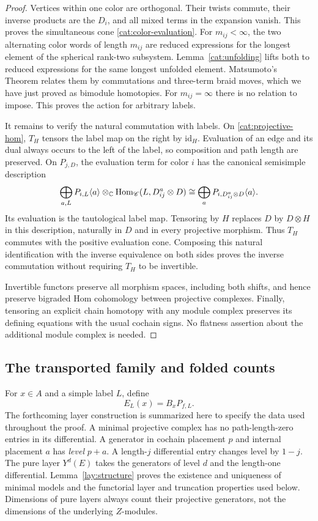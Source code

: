 \begin{proof}
Vertices within one color are orthogonal.  Their twists commute,
their inverse products are the $D_i$, and all mixed terms in the
expansion vanish.  This proves the simultaneous cone
\eqref{cat:color-evaluation}.  For $m_{ij}<\infty$, the two
alternating color words of length $m_{ij}$ are reduced expressions
for the longest element of the spherical rank-two subsystem.
Lemma~\ref{cat:unfolding} lifts both to reduced expressions for
the same longest unfolded element.  Matsumoto's Theorem relates
them by commutations and three-term braid moves, which we have
just proved as bimodule homotopies.  For $m_{ij}=\infty$ there is
no relation to impose.  This proves the action for arbitrary labels.

It remains to verify the natural commutation with labels.  On
\eqref{cat:projective-hom}, $T_H$ tensors the label map on the
right by $\mathrm{id}_H$.  Evaluation of an edge and its dual
always occurs to the left of the label, so composition and path
length are preserved.  On $P_{j,D}$, the evaluation term for
color $i$ has the canonical semisimple description
\[
 \bigoplus_{a,L}P_{i,L}\langle a\rangle\otimes_\mathbb C
             \operatorname{Hom}_{\mathscr C}(L,D^a_{ij}\otimes D)
 \cong\bigoplus_a P_{i,D^a_{ij}\otimes D}\langle a\rangle.
\]
Its evaluation is the tautological label map.  Tensoring by $H$
replaces $D$ by $D\otimes H$ in this description, naturally in
$D$ and in every projective morphism.  Thus $T_H$ commutes with
the positive evaluation cone.  Composing this natural
identification with the inverse equivalence on both sides proves
the inverse commutation without requiring $T_H$ to be invertible.

Invertible functors preserve all morphism spaces, including both
shifts, and hence preserve bigraded Hom cohomology between
projective complexes.  Finally, tensoring an explicit chain
homotopy with any module complex preserves its defining equations
with the usual cochain signs.  No flatness assertion about the
additional module complex is needed.
\end{proof}

\subsection{The transported family and folded counts}

For $x\in A$ and a simple label $L$, define
\begin{equation}
 E_L(x)=B_xP_{f,L}.
 \label{cat:family-definition}
\end{equation}
The forthcoming layer construction is summarized here to specify
the data used throughout the proof.  A minimal projective complex
has no path-length-zero entries in its differential.  A generator in
cochain placement $p$ and internal placement $a$ has \emph{level}
$p+a$.  A length-$j$ differential entry changes level by $1-j$.
The pure layer $Y^d(E)$ takes the generators of level $d$ and the
length-one differential.  Lemma~\ref{lay:structure} proves the
existence and uniqueness of minimal models and the functorial layer
and truncation properties used below.  Dimensions of pure layers
always count their projective generators, not the dimensions of
the underlying $Z$-modules.

